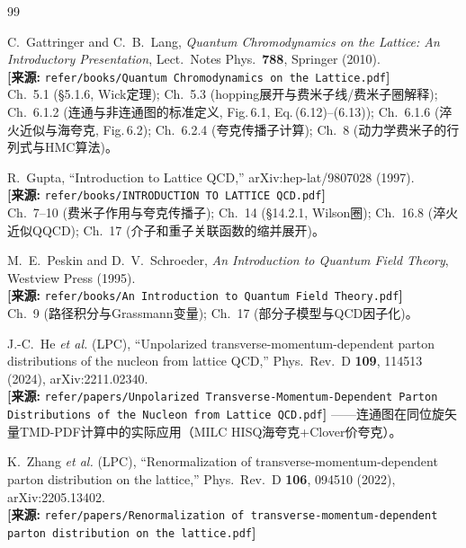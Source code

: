\documentclass[12pt,a4paper]{ctexart}
\theoremstyle{definition}
\begin{document}
\begin{thebibliography}{99}

C.~Gattringer and C.~B.~Lang,
\textit{Quantum Chromodynamics on the Lattice: An Introductory Presentation},
Lect.\ Notes Phys.\ \textbf{788}, Springer (2010).
\\\textbf{[来源:} \texttt{refer/books/Quantum Chromodynamics on the Lattice.pdf}\textbf{]}
\\Ch.~5.1 (\S 5.1.6, Wick定理); Ch.~5.3 (hopping展开与费米子线/费米子圈解释); Ch.~6.1.2 (连通与非连通图的标准定义, Fig.\,6.1, Eq.\,(6.12)--(6.13)); Ch.~6.1.6 (淬火近似与海夸克, Fig.\,6.2); Ch.~6.2.4 (夸克传播子计算); Ch.~8 (动力学费米子的行列式与HMC算法)。

R.~Gupta,
``Introduction to Lattice QCD,''
arXiv:hep-lat/9807028 (1997).
\\\textbf{[来源:} \texttt{refer/books/INTRODUCTION TO LATTICE QCD.pdf}\textbf{]}
\\Ch.~7--10 (费米子作用与夸克传播子); Ch.~14 (\S 14.2.1, Wilson圈); Ch.~16.8 (淬火近似QQCD); Ch.~17 (介子和重子关联函数的缩并展开)。

M.~E.~Peskin and D.~V.~Schroeder,
\textit{An Introduction to Quantum Field Theory},
Westview Press (1995).
\\\textbf{[来源:} \texttt{refer/books/An Introduction to Quantum Field Theory.pdf}\textbf{]}
\\Ch.~9 (路径积分与Grassmann变量); Ch.~17 (部分子模型与QCD因子化)。

J.-C.~He \textit{et al.} (LPC),
``Unpolarized transverse-momentum-dependent parton distributions of the nucleon from lattice QCD,''
Phys.\ Rev.\ D \textbf{109}, 114513 (2024), arXiv:2211.02340.
\\\textbf{[来源:} \texttt{refer/papers/Unpolarized Transverse-Momentum-Dependent Parton Distributions of the Nucleon from Lattice QCD.pdf}\textbf{]}
——连通图在同位旋矢量TMD-PDF计算中的实际应用（MILC HISQ海夸克+Clover价夸克）。

K.~Zhang \textit{et al.} (LPC),
``Renormalization of transverse-momentum-dependent parton distribution on the lattice,''
Phys.\ Rev.\ D \textbf{106}, 094510 (2022), arXiv:2205.13402.
\\\textbf{[来源:} \texttt{refer/papers/Renormalization of transverse-momentum-dependent parton distribution on the lattice.pdf}\textbf{]}


\end{thebibliography}
\end{document}
